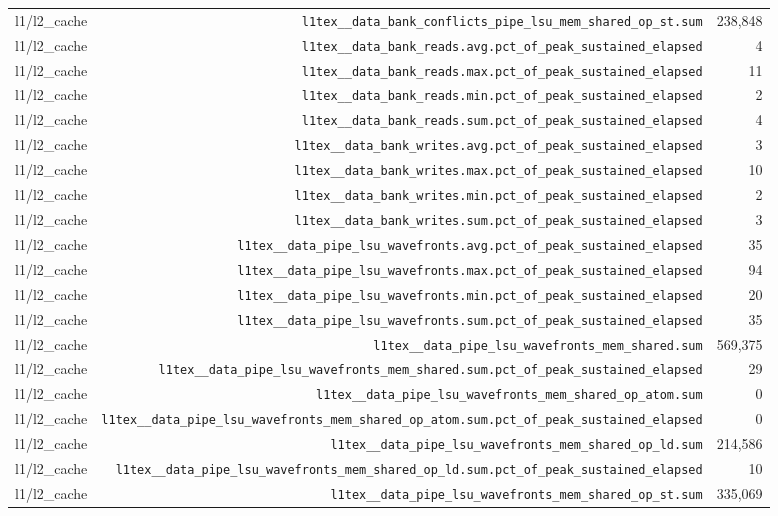 \begin{table}[h]
\begin{tabular}{|l|r|r|}
l1/l2_cache & \texttt{l1tex__data_bank_conflicts_pipe_lsu_mem_shared_op_st.sum} & 238,848 \\
l1/l2_cache & \texttt{l1tex__data_bank_reads.avg.pct_of_peak_sustained_elapsed} & 4 \\
l1/l2_cache & \texttt{l1tex__data_bank_reads.max.pct_of_peak_sustained_elapsed} & 11 \\
l1/l2_cache & \texttt{l1tex__data_bank_reads.min.pct_of_peak_sustained_elapsed} & 2 \\
l1/l2_cache & \texttt{l1tex__data_bank_reads.sum.pct_of_peak_sustained_elapsed} & 4 \\
l1/l2_cache & \texttt{l1tex__data_bank_writes.avg.pct_of_peak_sustained_elapsed} & 3 \\
l1/l2_cache & \texttt{l1tex__data_bank_writes.max.pct_of_peak_sustained_elapsed} & 10 \\
l1/l2_cache & \texttt{l1tex__data_bank_writes.min.pct_of_peak_sustained_elapsed} & 2 \\
l1/l2_cache & \texttt{l1tex__data_bank_writes.sum.pct_of_peak_sustained_elapsed} & 3 \\
l1/l2_cache & \texttt{l1tex__data_pipe_lsu_wavefronts.avg.pct_of_peak_sustained_elapsed} & 35 \\
l1/l2_cache & \texttt{l1tex__data_pipe_lsu_wavefronts.max.pct_of_peak_sustained_elapsed} & 94 \\
l1/l2_cache & \texttt{l1tex__data_pipe_lsu_wavefronts.min.pct_of_peak_sustained_elapsed} & 20 \\
l1/l2_cache & \texttt{l1tex__data_pipe_lsu_wavefronts.sum.pct_of_peak_sustained_elapsed} & 35 \\
l1/l2_cache & \texttt{l1tex__data_pipe_lsu_wavefronts_mem_shared.sum} & 569,375 \\
l1/l2_cache & \texttt{l1tex__data_pipe_lsu_wavefronts_mem_shared.sum.pct_of_peak_sustained_elapsed} & 29 \\
l1/l2_cache & \texttt{l1tex__data_pipe_lsu_wavefronts_mem_shared_op_atom.sum} & 0 \\
l1/l2_cache & \texttt{l1tex__data_pipe_lsu_wavefronts_mem_shared_op_atom.sum.pct_of_peak_sustained_elapsed} & 0 \\
l1/l2_cache & \texttt{l1tex__data_pipe_lsu_wavefronts_mem_shared_op_ld.sum} & 214,586 \\
l1/l2_cache & \texttt{l1tex__data_pipe_lsu_wavefronts_mem_shared_op_ld.sum.pct_of_peak_sustained_elapsed} & 10 \\
l1/l2_cache & \texttt{l1tex__data_pipe_lsu_wavefronts_mem_shared_op_st.sum} & 335,069 \\

\end{tabular}
\end{table}
